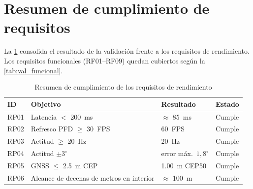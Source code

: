 \section{Resumen de cumplimiento de requisitos}
\label{sec:val_resumen}

La \cref{tab:val_cumplimiento} consolida el resultado de la validación frente a
los requisitos de rendimiento. Los requisitos funcionales (RF01--RF09) quedan
cubiertos según la \cref{tab:val_funcional}.

\begin{table}[H]
    \centering
    \caption{Resumen de cumplimiento de los requisitos de rendimiento}
    \label{tab:val_cumplimiento}
    \footnotesize
    \begin{tabularx}{\linewidth}{l X l l}
        \toprule
        \textbf{ID} & \textbf{Objetivo} & \textbf{Resultado} & \textbf{Estado} \\
        \midrule
        RP01 & Latencia $<$ \SI{200}{\milli\second}            & $\approx$ \SI{85}{\milli\second}  & Cumple \\
        RP02 & Refresco PFD $\geq$ \SI{30}{FPS}                & \SI{60}{FPS}            & Cumple \\
        RP03 & Actitud $\geq$ \SI{20}{\hertz}                  & \SI{20}{\hertz}  & Cumple \\
        RP04 & Actitud $\pm 3^{\circ}$                & error máx.\ $1{,}8^{\circ}$ & Cumple \\
        RP05 & GNSS $\leq$ \SI{2.5}{\meter} CEP                & \SI{1.00}{\meter} CEP50 & Cumple \\
        RP06 & Alcance de decenas de metros en interior        & $\approx$ \SI{100}{\meter} & Cumple \\
        \bottomrule
    \end{tabularx}
\end{table}